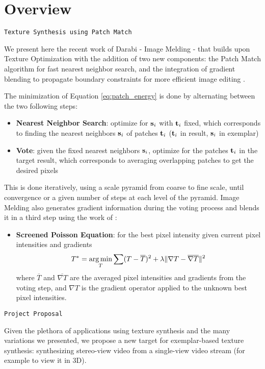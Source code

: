 
\section{Overview}
\texttt{Texture Synthesis using Patch Match}

We present here the recent work of Darabi \cite{Darabi12} - Image Melding - that builds upon Texture Optimization \cite{Kwatra05} with the addition of two new components: the Patch Match algorithm \cite{Barnes09} for fast nearest neighbor search, and the integration of gradient blending to propagate boundary constraints for more efficient image editing \cite{Agarwala04}.

The minimization of Equation \ref{eq:patch_energy} is done by alternating between the two following steps:
\begin{itemize}
	\setlength{\itemsep}{4pt}
  \setlength{\parskip}{0pt}
  \setlength{\parsep}{0pt}
	\item \textbf{Nearest Neighbor Search}: optimize for $\mathbf{s}_i$ with $\mathbf{t}_i$ fixed, which corresponds to finding the nearest neighbors $\mathbf{s}_i$ of patches $\mathbf{t}_i$ ($\mathbf{t}_i$ in result, $\mathbf{s}_i$ in exemplar)
	\item \textbf{Vote}: given the fixed nearest neighbors $\mathbf{s}_i$, optimize for the patches $\mathbf{t}_i$ in the target result, which corresponds to averaging overlapping patches to get the desired pixels
\end{itemize}

This is done iteratively, using a scale pyramid from coarse to fine scale, until convergence or a given number of steps at each level of the pyramid.
Image Melding also generates gradient information during the voting process and blends it in a third step using the work of \cite{Bhat08}:
\begin{itemize}
	\item \textbf{Screened Poisson Equation}: for the best pixel intensity given current pixel intensities and gradients
\[
	T^*=\operatorname*{arg\,min}_{T} \sum (T - \overline{T})^2 + \lambda \| \nabla T - \overline{\nabla T}\|^2
\]
where $\overline{T}$ and $\overline{\nabla T}$ are the averaged pixel intensities and gradients from the voting step, and $\nabla T$ is the gradient operator applied to the unknown best pixel intensities.
\end{itemize}

\texttt{Project Proposal}

Given the plethora of applications using texture synthesis and the many variations we presented, we propose a new target for exemplar-based texture synthesis: synthesizing stereo-view video from a single-view video stream (for example to view it in 3D).

